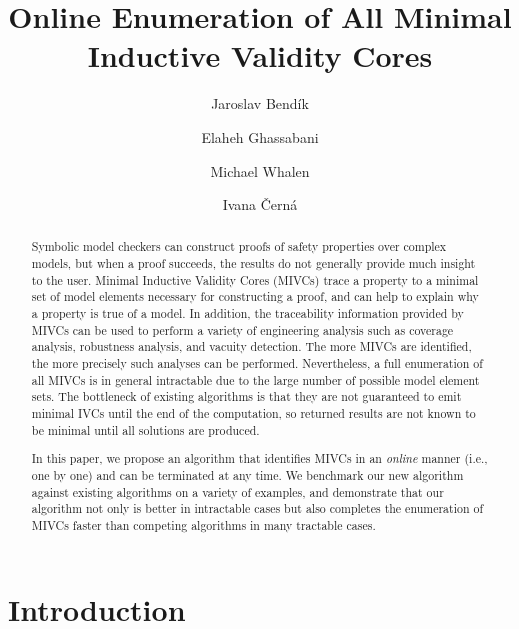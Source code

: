 \documentclass{llncs}
\begin{document}
\title{Online Enumeration of All Minimal Inductive Validity Cores}

\author{Jaroslav Bend\'ik
	\and Elaheh Ghassabani
	\and Michael Whalen
	\and Ivana \v Cern\'a
}



\maketitle
\begin{abstract}
Symbolic model checkers can construct proofs of safety properties over complex models, but when a proof succeeds, the results do not generally provide much insight to the user.  Minimal Inductive Validity Cores (MIVCs) trace a property to a minimal set of model elements necessary for constructing a proof, and can help to explain why a property is true of a model.  In addition, the traceability information provided by MIVCs can be used to perform a variety of engineering analysis such as coverage analysis, robustness analysis, and vacuity detection.  The more MIVCs are identified, the more precisely such analyses can be performed.   Nevertheless, a full enumeration of all MIVCs is in general intractable due to the large number of possible model element sets.  The bottleneck of existing algorithms is that they are not guaranteed to emit minimal IVCs until the end of the computation, so returned results are not known to be minimal until all solutions are produced.

In this paper, we propose an algorithm that identifies MIVCs in an \emph{online} manner (i.e., one by one) and can be terminated at any time.  We benchmark our new algorithm against existing algorithms on a variety of examples, and demonstrate that our algorithm not only is better in intractable cases but also completes the enumeration of MIVCs faster than competing algorithms in many tractable cases.

\end{abstract}


\section{Introduction}
\label{sec:intro}

\end{document}
